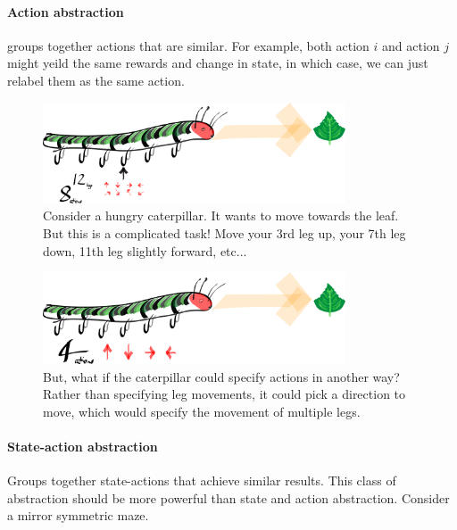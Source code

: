 \paragraph{Action abstraction}

groups together actions that are similar. For
example, both action $i$ and action $j$ might yeild the same rewards and change in state,
in which case, we can just relabel them as the same action.

\begin{figure}[h!]
\centering
\includegraphics[width=0.8\textwidth,height=0.2\textheight]{../../pictures/drawings/hungry-caterpillar.png}
\caption{Consider a hungry caterpillar. It wants to move towards the leaf. But this is a complicated task! Move your 3rd leg up, your 7th leg down, 11th leg slightly forward, etc...}
\end{figure}


\begin{figure}[h!]
\centering
\includegraphics[width=0.8\textwidth,height=0.2\textheight]{../../pictures/drawings/full-caterpillar.png}
\caption{But, what if the caterpillar could specify actions in another way?
Rather than specifying leg movements, it could pick a direction to move,
which would specify the movement of multiple legs.}
\end{figure}

\paragraph{State-action abstraction}

Groups together state-actions that achieve similar results. This class of abstraction
should be more powerful than state and action abstraction. Consider a mirror symmetric maze.

